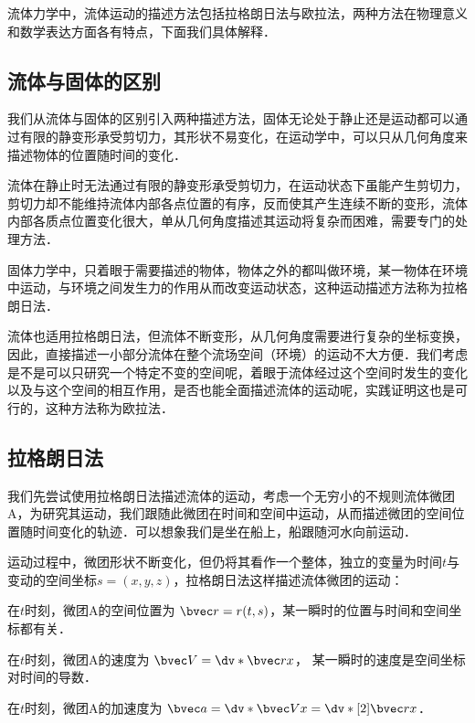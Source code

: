 
\begin{issues}
\issueDraft
\end{issues}

流体力学中，流体运动的描述方法包括拉格朗日法与欧拉法，两种方法在物理意义和数学表达方面各有特点，下面我们具体解释．

\subsection{流体与固体的区别}
我们从流体与固体的区别引入两种描述方法，固体无论处于静止还是运动都可以通过有限的静变形承受剪切力，其形状不易变化，在运动学中，可以只从几何角度来描述物体的位置随时间的变化．

流体在静止时无法通过有限的静变形承受剪切力，在运动状态下虽能产生剪切力，剪切力却不能维持流体内部各点位置的有序，反而使其产生连续不断的变形，流体内部各质点位置变化很大，单从几何角度描述其运动将复杂而困难，需要专门的处理方法．

固体力学中，只着眼于需要描述的物体，物体之外的都叫做环境，某一物体在环境中运动，与环境之间发生力的作用从而改变运动状态，这种运动描述方法称为拉格朗日法．

流体也适用拉格朗日法，但流体不断变形，从几何角度需要进行复杂的坐标变换，因此，直接描述一小部分流体在整个流场空间（环境）的运动不大方便．我们考虑是不是可以只研究一个特定不变的空间呢，着眼于流体经过这个空间时发生的变化以及与这个空间的相互作用，是否也能全面描述流体的运动呢，实践证明这也是可行的，这种方法称为欧拉法．

\subsection{拉格朗日法}
我们先尝试使用拉格朗日法描述流体的运动，考虑一个无穷小的不规则流体微团A，为研究其运动，我们跟随此微团在时间和空间中运动，从而描述微团的空间位置随时间变化的轨迹．可以想象我们是坐在船上，船跟随河水向前运动．

运动过程中，微团形状不断变化，但仍将其看作一个整体，独立的变量为时间$t$与变动的空间坐标$s=(x,y,z)$，拉格朗日法这样描述流体微团的运动：

在$t$时刻，微团A的空间位置为 $\bvec r=r(t,s)$，某一瞬时的位置与时间和空间坐标都有关．

在$t$时刻，微团A的速度为 $\bvec V=\dv*{\bvec r}{x}$，
某一瞬时的速度是空间坐标对时间的导数．

在$t$时刻，微团A的加速度为 $\bvec a=\dv*{\bvec V}{x}=\dv*[2]{\bvec r}{x}$．

